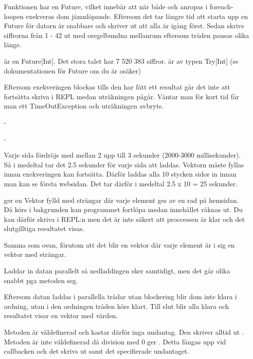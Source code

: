 \Subtask Funktionen  har en Future, vilket innebär att när både  och  anropas i foreach-loopen exekveras dom jämnlöpande. Eftersom det tar längre tid att starta upp en Future för datorn är  snabbare och skriver ut att alla är igång först. Sedan skrivs siffrorna från 1 - 42 ut med oregelbundna mellanrum eftersom tråden pausas olika länge.

\Subtask {} är en Future[Int]. Det stora talet har 7 520 383 siffror.  är av typen Try[Int] (se dokumentationen för Future om du är osäker)

\Subtask Eftersom exekveringen blockas tills den har fått ett resultat går det inte att fortsätta skriva i REPL medan uträkningen pågår. Väntar man för kort tid får man ett TimeOutException och uträkningen avbryts.

\Task     %

\Subtask -

\Subtask -

\Subtask Varje sida fördröjs med mellan 2 upp till 3 sekunder (2000-3000 millisekunder). Så i medeltal tar det 2.5 sekunder för varje sida att laddas. Vektorn måste fyllas innan exekveringen kan fortsätta. Därför laddas alla 10 stycken sidor in innan man kan se första websidan. Det tar därför i medeltal 2.5 x 10 = 25 sekunder.

\Subtask {} ger en Vektor fylld med strängar där varje element ges av en rad på hemsidan. Då  körs i bakgrunden kan programmet fortlöpa medan innehållet räknas ut. Du kan därför skriva  i REPL:n men det är inte säkert att proccessen är klar och det slutgilltiga resultatet visas.

\Subtask Samma som ovan, förutom att det blir en vektor där varje element är i sig en vektor med strängar. 

\Subtask Laddar in datan parallelt så nedladdingen sker samtidigt, men det går olika snabbt pga metoden seg.

\Subtask Eftersom datan laddas i parallella trådar utan blockering blir dom inte klara i ordning, utan i den ordningen tråden körs klart. Till slut blir alla klara och resultatet visar en vektor med  värden.

\Subtask Metoden  är väldefinerad och kastar därför inga undantag. Den skriver alltid ut \code{:)}. Metoden  är inte väldefinerad då division med 0 ger . Detta fångas upp vid callbacken och det skrivs ut \code{:(} samt det specifierade undantaget.

